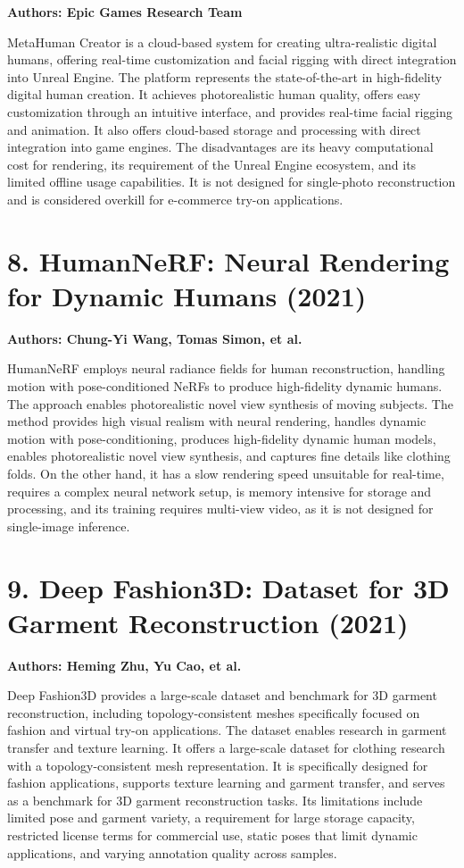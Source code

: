 \documentclass[12pt,a4paper,oneside]{report}
\begin{document}
\textbf{Authors: Epic Games Research Team}

MetaHuman Creator is a cloud-based system for creating ultra-realistic digital humans, offering real-time customization and facial rigging with direct integration into Unreal Engine. The platform represents the state-of-the-art in high-fidelity digital human creation. It achieves photorealistic human quality, offers easy customization through an intuitive interface, and provides real-time facial rigging and animation. It also offers cloud-based storage and processing with direct integration into game engines. The disadvantages are its heavy computational cost for rendering, its requirement of the Unreal Engine ecosystem, and its limited offline usage capabilities. It is not designed for single-photo reconstruction and is considered overkill for e-commerce try-on applications.

\section*{8. HumanNeRF: Neural Rendering for Dynamic Humans (2021)}

\textbf{Authors: Chung-Yi Wang, Tomas Simon, et al.}

HumanNeRF employs neural radiance fields for human reconstruction, handling motion with pose-conditioned NeRFs to produce high-fidelity dynamic humans. The approach enables photorealistic novel view synthesis of moving subjects. The method provides high visual realism with neural rendering, handles dynamic motion with pose-conditioning, produces high-fidelity dynamic human models, enables photorealistic novel view synthesis, and captures fine details like clothing folds. On the other hand, it has a slow rendering speed unsuitable for real-time, requires a complex neural network setup, is memory intensive for storage and processing, and its training requires multi-view video, as it is not designed for single-image inference.

\section*{9. Deep Fashion3D: Dataset for 3D Garment Reconstruction (2021)}

\textbf{Authors: Heming Zhu, Yu Cao, et al.}

Deep Fashion3D provides a large-scale dataset and benchmark for 3D garment reconstruction, including topology-consistent meshes specifically focused on fashion and virtual try-on applications. The dataset enables research in garment transfer and texture learning. It offers a large-scale dataset for clothing research with a topology-consistent mesh representation. It is specifically designed for fashion applications, supports texture learning and garment transfer, and serves as a benchmark for 3D garment reconstruction tasks. Its limitations include limited pose and garment variety, a requirement for large storage capacity, restricted license terms for commercial use, static poses that limit dynamic applications, and varying annotation quality across samples.
\end{document}
